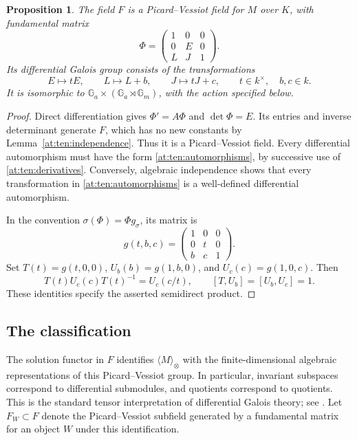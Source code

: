 \documentclass[11pt,a4paper]{article}
\newcommand{\Ga}{\mathbb G_a}
\newcommand{\Gm}{\mathbb G_m}
\newtheorem{proposition}[theorem]{Proposition}
\theoremstyle{definition}
\theoremstyle{remark}
\numberwithin{equation}{section}
\begin{document}
\begin{proposition}\label{at:ten:group}
The field $F$ is a Picard--Vessiot field for $M$ over $K$, with
fundamental matrix
\begin{equation}\label{at:ten:fundamental}
 \Phi=\begin{pmatrix}1&0&0\\0&E&0\\L&J&1\end{pmatrix}.
\end{equation}
Its differential Galois group consists of the transformations
\begin{equation}\label{at:ten:automorphisms}
 E\longmapsto tE,\qquad L\longmapsto L+b,\qquad
 J\longmapsto tJ+c,
 \qquad t\in k^\times,\quad b,c\in k.
\end{equation}
It is isomorphic to $\Ga\times(\Ga\rtimes\Gm)$, with the action
specified below.
\end{proposition}

\begin{proof}
Direct differentiation gives $\Phi'=A\Phi$ and $\det\Phi=E$.
Its entries and inverse determinant generate $F$, which has no new
constants by Lemma~\ref{at:ten:independence}.  Thus it is a
Picard--Vessiot field.  Every differential automorphism must have
the form \eqref{at:ten:automorphisms}, by successive use of
\eqref{at:ten:derivatives}.  Conversely, algebraic independence shows
that every transformation in \eqref{at:ten:automorphisms} is a
well-defined differential automorphism.

In the convention $\sigma(\Phi)=\Phi g_\sigma$, its matrix is
\[
 g(t,b,c)=\begin{pmatrix}1&0&0\\0&t&0\\b&c&1\end{pmatrix}.
\]
Set $T(t)=g(t,0,0)$, $U_b(b)=g(1,b,0)$, and
$U_c(c)=g(1,0,c)$.  Then
\begin{equation}\label{at:ten:conjugation}
 T(t)U_c(c)T(t)^{-1}=U_c(c/t),\qquad
 [T,U_b]=[U_b,U_c]=1.
\end{equation}
These identities specify the asserted semidirect product.
\end{proof}

\subsection{The classification}

The solution functor in $F$ identifies $\langle M\rangle_\otimes$
with the finite-dimensional algebraic representations of this
Picard--Vessiot group.  In particular, invariant subspaces correspond
to differential submodules, and quotients correspond to quotients.
This is the standard tensor interpretation of differential Galois
theory; see \cite[Sections~I and IV]{at:Katz1982}.  Let $F_W\subset F$
denote the Picard--Vessiot subfield generated by a fundamental matrix
for an object $W$ under this identification.
\end{document}
